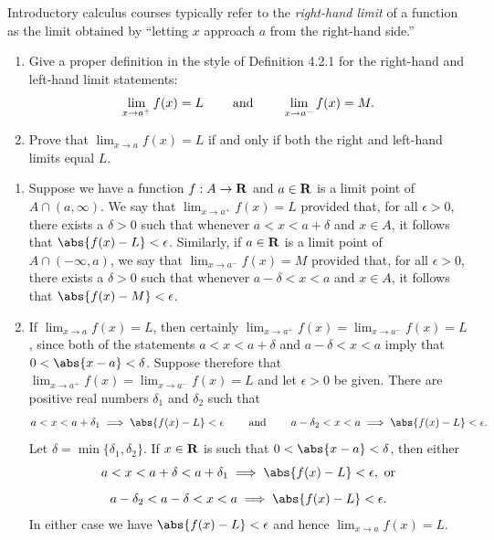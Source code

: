 \documentclass{lew98_solutions}
\begin{document}
\begin{exercise}
\label{ex:4.2.10}
    Introductory calculus courses typically refer to the \textit{right-hand limit} of a function as the limit obtained by ``letting \( x \) approach \( a \) from the right-hand side.''
    \begin{enumerate}
        \item Give a proper definition in the style of Definition 4.2.1 for the right-hand and left-hand limit statements:
        \[
            \lim_{x \to a^+} f(x) = L \hspace{8mm} \text{and} \hspace{8mm} \lim_{x \to a^-} f(x) = M.
        \]

        \item Prove that \( \lim_{x \to a} f(x) = L \) if and only if both the right and left-hand limits equal \( L \).
    \end{enumerate}
\end{exercise}

\begin{solution}
    \begin{enumerate}
        \item Suppose we have a function \( f : A \to \mathbf{R} \) and \( a \in \mathbf{R} \) is a limit point of \( A \cap (a, \infty) \). We say that \( \lim_{x \to a^+} f(x) = L \) provided that, for all \( \epsilon > 0 \), there exists a \( \delta > 0 \) such that whenever \( a < x < a + \delta \) and \( x \in A \), it follows that \( \abs{f(x) - L} < \epsilon \). Similarly, if \( a \in \mathbf{R} \) is a limit point of \( A \cap (-\infty, a) \), we say that \( \lim_{x \to a^-} f(x) = M \) provided that, for all \( \epsilon > 0 \), there exists a \( \delta > 0 \) such that whenever \( a - \delta < x < a \) and \( x \in A \), it follows that \( \abs{f(x) - M} < \epsilon \).

        \item If \( \lim_{x \to a} f(x) = L \), then certainly \( \lim_{x \to a^+} f(x) = \lim_{x \to a^-} f(x) = L \), since both of the statements \( a < x < a + \delta \) and \( a - \delta < x < a \) imply that \( 0 < \abs{x - a} < \delta \). Suppose therefore that \( \lim_{x \to a^+} f(x) = \lim_{x \to a^-} f(x) = L \) and let \( \epsilon > 0 \) be given. There are positive real numbers \( \delta_1 \) and \( \delta_2 \) such that
        \[
            a < x < a + \delta_1 \implies \abs{f(x) - L} < \epsilon \hspaceand a - \delta_2 < x < a \implies \abs{f(x) - L} < \epsilon.
        \]
        Let \( \delta = \min \{ \delta_1, \delta_2 \} \). If \( x \in \mathbf{R} \) is such that \( 0 < \abs{x - a} < \delta \), then either
        \begin{gather*}
            a < x < a + \delta < a + \delta_1 \implies \abs{f(x) - L} < \epsilon, \text{ or} \\[2mm]
            a - \delta_2 < a - \delta < x < a \implies \abs{f(x) - L} < \epsilon.
        \end{gather*}
        In either case we have \( \abs{f(x) - L} < \epsilon \) and hence \( \lim_{x \to a} f(x) = L \).
    \end{enumerate}
\end{solution}
\end{document}
